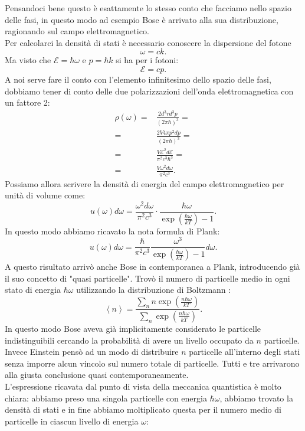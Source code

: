 Pensandoci bene questo è esattamente lo stesso conto che facciamo nello spazio delle fasi, in questo modo ad esempio Bose è arrivato alla sua distribuzione, ragionando sul campo elettromagnetico.\\
Per calcolarci la densità di stati è necessario conoscere la dispersione del fotone
\[
	\omega = ck 
.\] 
Ma visto che $\mathcal{E} = \hbar\omega $ e $p = \hbar k$ si ha per i fotoni:
\[
	\mathcal{E} = cp
.\] 
A noi serve fare il conto con l'elemento infinitesimo dello spazio delle fasi, dobbiamo tener di conto delle due polarizzazioni dell'onda elettromagnetica con un fattore 2:
\[\begin{aligned}
	\rho ( \omega ) 
	=&
	\frac{2d^3r d^3p}{\left( 2\pi \hbar \right)^3}=\\
	=& \frac{2V 4\pi p^2 dp}{\left( 2\pi\hbar  \right) ^3} =\\
	=& \frac{V\mathcal{E}^2 d\mathcal{E} }{\pi^2c^3\hbar^3}=\\
	=& \frac{V\omega ^2 d\omega }{\pi^2c^3}
.\end{aligned}\]
Possiamo allora scrivere la densità di energia del campo elettromagnetico per unità di volume come:
\[
	u( \omega ) d\omega = \frac{\omega ^2 d\omega }{\pi^2 c^3}\cdot \frac{\hbar\omega }{\exp\left( \frac{\hbar\omega }{kT} \right) -1}  
.\] 
In questo modo abbiamo ricavato la nota formula di Plank:
\[
	u( \omega ) d\omega = \frac{\hbar}{\pi^2 c^3}
	\frac{\omega ^3}{\exp\left( \frac{\hbar\omega }{kT} \right) -1}d\omega 
.\] 
A questo risultato arrivò anche Bose in contemporanea a Plank, introducendo già il suo concetto di "quasi particelle". Trovò il numero di particelle medio in ogni stato di energia $\hbar\omega $ utilizzando la distribuzione di Boltzmann :
\[
	\left<n \right> = \frac{\sum_{n}^{} n \exp\left( \frac{n \hbar \omega }{kT} \right) }{\sum_{n}^{}\exp\left( \frac{n \hbar \omega }{kT} \right)}
.\] 
In questo modo Bose aveva già implicitamente considerato le particelle indistinguibili cercando la probabilità di avere un livello occupato da $n$ particelle.\\
Invece Einstein pensò ad un modo di distribuire  $n$ particelle all'interno degli stati senza imporre alcun vincolo sul numero totale di particelle. Tutti e tre arrivarono alla giusta conclusione quasi contemporaneamente.\\
L'espressione ricavata dal punto di vista della meccanica quantistica è molto chiara: abbiamo preso una singola particelle con energia $\hbar\omega $, abbiamo trovato la densità di stati e in fine abbiamo moltiplicato questa per il numero medio di particelle in ciascun livello di energia $\omega $:
